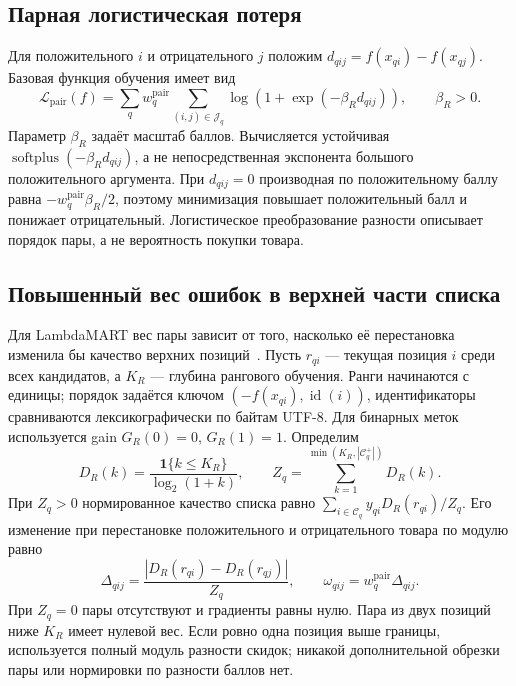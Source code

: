 \documentclass[12pt,a4paper]{article}
\newcommand{\ind}{\mathbf 1}
\theoremstyle{plainru}
\begin{document}
\subsection{Парная логистическая потеря}

Для положительного $i$ и отрицательного $j$ положим
$d_{qij}=f(x_{qi})-f(x_{qj})$.
Базовая функция обучения имеет вид
\begin{equation}\label{eq:model-pairwise-loss}
\mathcal L_{\mathrm{pair}}(f)=
\sum_q w_q^{\mathrm{pair}}\sum_{(i,j)\in\mathcal J_q}
\log\!\left(1+\exp(-\beta_R d_{qij})\right),
\qquad \beta_R>0.
\end{equation}
Параметр $\beta_R$ задаёт масштаб баллов.
Вычисляется устойчивая $\operatorname{softplus}(-\beta_Rd_{qij})$,
а не непосредственная экспонента большого положительного аргумента.
При $d_{qij}=0$ производная по положительному баллу равна
$-w_q^{\mathrm{pair}}\beta_R/2$, поэтому минимизация повышает положительный балл
и понижает отрицательный. Логистическое преобразование разности
описывает порядок пары, а не вероятность покупки товара.

\subsection{Повышенный вес ошибок в верхней части списка}

Для LambdaMART вес пары зависит от того, насколько её перестановка
изменила бы качество верхних позиций~\cite{lambdamart}.
Пусть $r_{qi}$ --- текущая позиция $i$ среди всех кандидатов,
а $K_R$ --- глубина рангового обучения. Ранги начинаются с единицы;
порядок задаётся ключом $(-f(x_{qi}),\operatorname{id}(i))$,
идентификаторы сравниваются лексикографически по байтам UTF-8.
Для бинарных меток используется gain $G_R(0)=0$, $G_R(1)=1$.
Определим
\begin{equation}\label{eq:model-rank-discount}
D_R(k)=\frac{\ind\{k\le K_R\}}{\log_2(1+k)},\qquad
Z_q=\sum_{k=1}^{\min(K_R,|\mathcal C_q^+|)}D_R(k).
\end{equation}
При $Z_q>0$ нормированное качество списка равно
$\sum_{i\in\mathcal C_q}y_{qi}D_R(r_{qi})/Z_q$.
Его изменение при перестановке положительного и отрицательного
товара по модулю равно
\begin{equation}\label{eq:model-lambda-weight}
\Delta_{qij}=
\frac{|D_R(r_{qi})-D_R(r_{qj})|}{Z_q},\qquad
\omega_{qij}=w_q^{\mathrm{pair}}\Delta_{qij}.
\end{equation}
При $Z_q=0$ пары отсутствуют и градиенты равны нулю.
Пара из двух позиций ниже $K_R$ имеет нулевой вес. Если ровно одна
позиция выше границы, используется полный модуль разности скидок;
никакой дополнительной обрезки пары или нормировки по разности
баллов нет.
\end{document}
